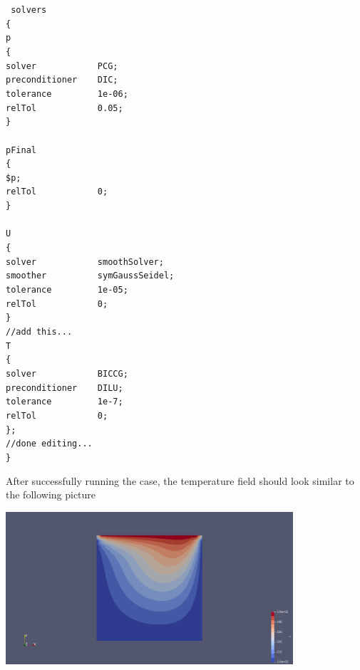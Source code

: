 \documentclass{article}
\newcommand\tab[1][0.5cm]{\hspace*{#1}}
\begin{document}
\begin{enumerate}[2.1]
	\begin{myframe}
	{\tt %
	solvers\\
	\{\\
    \tab  p\\
	\tab \{\\
	\tab \tab solver~~~~~~~~~~~~PCG;\\
	\tab \tab preconditioner~~~~DIC;\\
	\tab \tab tolerance~~~~~~~~~1e-06;\\
	\tab \tab relTol~~~~~~~~~~~~0.05;\\
	\tab \}\\
	\\
	\tab pFinal\\
	\tab \{\\
	\tab \tab\$p;\\
	\tab \tab relTol~~~~~~~~~~~~0;\\
	\tab \}\\
	\\
	\tab U\\
	\tab \{\\
	\tab \tab solver~~~~~~~~~~~~smoothSolver;\\
	\tab \tab smoother~~~~~~~~~~symGaussSeidel;\\
	\tab \tab tolerance~~~~~~~~~1e-05;\\
	\tab \tab relTol~~~~~~~~~~~~0;\\
	\tab \}\\
	\tab //add this...\\
	\tab T \\
	\tab \{\\
	\tab \tab solver~~~~~~~~~~~~BICCG;\\
	\tab \tab preconditioner~~~~DILU;\\
	\tab \tab tolerance~~~~~~~~~1e-7;\\
	\tab \tab relTol~~~~~~~~~~~~0;\\
	\tab \};\\
	\tab //done editing...\\
	\}
	}
	\end{myframe}


	After successfully running the case, the temperature field should look similar to the following picture
	
	\begin{center}
		\includegraphics[width = 0.8\textwidth]{temp.png}
	\end{center}
	

\end{enumerate}
\end{document}
